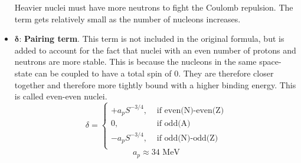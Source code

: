 \documentclass{article}
\begin{document}
\begin{itemize}
\begin{equation}
    \end{equation}
    Heavier nuclei must have more neutrons to fight the Coulomb repulsion. The term gets relatively small as the number of nucleons increases. 
    \item $\mathbf{δ}$: \textbf{Pairing term}. This term is not included in the original formula, but is added to account for the fact that nuclei with an even number of protons and neutrons are more stable. This is because the nucleons in the same space-state can be coupled to have a total spin of 0. They are therefore closer together and therefore more tightly bound with a higher binding energy. This is called even-even nuclei. 
    \begin{equation}
    δ =  \begin{cases}
        +a_pS^{-3 / 4}, &\text{ if even(N)-even(Z)}\\
        0, &\text{ if odd(A)}\\
        -a_pS^{-3 / 4}, &\text{ if odd(N)-odd(Z)}\\
    \end{cases} 
    \end{equation}
    \begin{equation}
    a_p ≈ 34 \text{ MeV}
    \end{equation}
\end{itemize}
\end{document}
